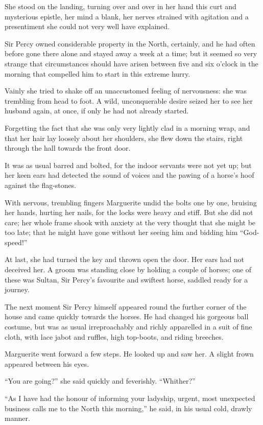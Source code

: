\documentclass[paper=5.5in:8.5in,BCOR=7mm,twoside,DIV=calc,12pt,usegeometry,chapterprefix,endperiod,headings=big]{scrbook}
\begin{document}
She stood on the landing, turning over and over in her hand this curt and mysterious epistle, her mind a blank, her nerves strained with agitation and a presentiment she could not very well have explained.

Sir Percy owned considerable property in the North, certainly, and he had often before gone there alone and stayed away a week at a time; but it seemed so very strange that circumstances should have arisen between five and six o'clock in the morning that compelled him to start in this extreme hurry.

Vainly she tried to shake off an unaccustomed feeling of nervousness: she was trembling from head to foot. A wild, unconquerable desire seized her to see her husband again, at once, if only he had not already started.

Forgetting the fact that she was only very lightly clad in a morning wrap, and that her hair lay loosely about her shoulders, she flew down the stairs, right through the hall towards the front door.

It was as usual barred and bolted, for the indoor servants were not yet up; but her keen ears had detected the sound of voices and the pawing of a horse's hoof against the flag-stones.

With nervous, trembling fingers Marguerite undid the bolts one by one, bruising her hands, hurting her nails, for the locks were heavy and stiff. But she did not care; her whole frame shook with anxiety at the very thought that she might be too late; that he might have gone without her seeing him and bidding him \enquote{God-speed!}

At last, she had turned the key and thrown open the door. Her ears had not deceived her. A groom was standing close by holding a couple of horses; one of these was Sultan, Sir Percy's favourite and swiftest horse, saddled ready for a journey.

The next moment Sir Percy himself appeared round the further corner of the house and came quickly towards the horses. He had changed his gorgeous ball costume, but was as usual irreproachably and richly apparelled in a suit of fine cloth, with lace jabot and ruffles, high top-boots, and riding breeches.

Marguerite went forward a few steps. He looked up and saw her. A slight frown appeared between his eyes.

\enquote{You are going?} she said quickly and feverishly. \enquote{Whither?}

\enquote{As I have had the honour of informing your ladyship, urgent, most unexpected business calls me to the North this morning,} he said, in his usual cold, drawly manner.
\end{document}
